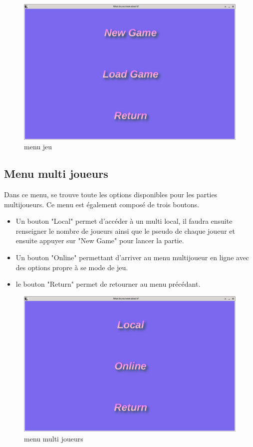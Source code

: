 \begin{figure}[h]
	\centering
	\includegraphics[width=\textwidth]{menujeu.png}
	\caption{menu jeu}
	\label{fig:menu_jeu}
\end{figure}

\newpage
\subsection{Menu multi joueurs}
Dans ce menu, se trouve toute les options disponibles pour les parties multijoueurs. Ce menu est également 
composé de trois boutons.
\begin{itemize}
	\item Un bouton "Local" permet d'accéder à un multi local, il faudra ensuite renseigner le nombre de joueurs
		ainsi que le pseudo de chaque joueur et ensuite appuyer sur "New Game" pour lancer la partie.
	\item Un bouton "Online" permettant d'arriver au menu multijoueur en ligne avec des options propre à se 
		mode de jeu.
	\item le bouton "Return" permet de retourner au menu précédant.
\end{itemize} 

\begin{figure}[h]
	\centering
	\includegraphics[width=\textwidth]{menumulti.png}
	\caption{menu multi joueurs}
	\label{fig:menu_multi_joueurs}
\end{figure}

